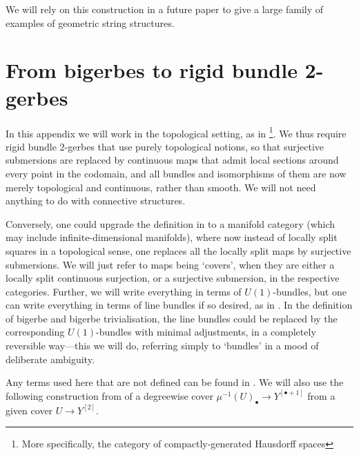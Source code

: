 \documentclass[12pt]{amsart}
\theoremstyle{plain}
\theoremstyle{definition}
\theoremstyle{remark}
\numberwithin{equation}{section}
\newcommand{\<}{\langle}
\renewcommand{\>}{\rangle}
\begin{document}
We will rely on this construction in a future paper to give a large family of examples of geometric string structures.




















\section{From bigerbes to rigid bundle 2-gerbes}\label{app:bigerbes}

In this appendix we will work in the topological setting, as in \cite{KM19}\footnote{More specifically, the category of compactly-generated Hausdorff spaces}. 
We thus require rigid bundle 2-gerbes that use purely topological notions, so that surjective submersions are replaced by continuous maps that admit local sections around every point in the codomain, and all bundles and isomorphisms of them are now merely topological and continuous, rather than smooth.
We will not need anything to do with connective structures. 

Conversely, one could upgrade the definition in \cite{KM19} to a manifold category (which may include infinite-dimensional manifolds), where now instead of locally split squares in a topological sense, one replaces all the locally split maps by surjective submersions.
We will just refer to maps being `covers', when they are either a locally split continuous surjection, or a surjective submersion, in the respective categories.
Further, we will write everything in terms of $U(1)$-bundles, but one can write everything in terms of line bundles if so desired, as in \cite{KM19}. 
In the definition of bigerbe and bigerbe trivialisation, the line bundles could be replaced by the corresponding $U(1)$-bundles with minimal adjustments, in a completely reversible way---this we will do, referring simply to `bundles' in a mood of deliberate ambiguity. 

Any terms used here that are not defined can be found in \cite{KM19}. 
We will also use the following construction from \cite[Example 2.7]{MRSV} of a degreewise cover $\mu^{-1}(U)_\bullet \to Y^{[\bullet + 1]}$ from a given cover $U\to Y^{[2]}$.
\end{document}

